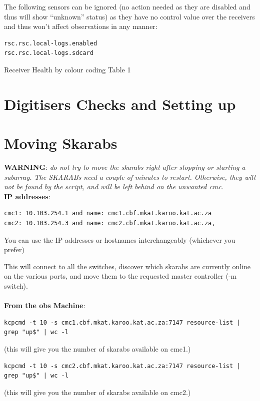 The following sensors can be ignored (no action needed as they are disabled and thus will show “unknown” status) as they have no control value over the receivers and thus won’t affect observations in any manner:
\begin{lstlisting}[style=DOS]
rsc.rsc.local-logs.enabled
rsc.rsc.local-logs.sdcard
\end{lstlisting}


Receiver Health by colour coding
Table 1

\section{Digitisers Checks and Setting up }




\section{Moving Skarabs}


\textbf{WARNING}:\textit{ do not try to move the skarabs right after stopping or starting a subarray. The SKARABs need a couple of minutes to restart. Otherwise, they will not be found by the script, and will be left behind on the unwanted cmc.}\\

\textbf{IP addresses}:\\
\begin{lstlisting}[style=DOS]
cmc1: 10.103.254.1 and name: cmc1.cbf.mkat.karoo.kat.ac.za 
cmc2: 10.103.254.3 and name: cmc2.cbf.mkat.karoo.kat.ac.za, 
\end{lstlisting}
You can use the IP addresses or hostnames interchangeably (whichever you prefer) 

This will connect to all the switches, discover which skarabs are currently online on the various ports, and move them to the requested master controller (-m switch).\\
\\
\textbf{From the obs Machine}:

\begin{lstlisting}[style=DOS]
kcpcmd -t 10 -s cmc1.cbf.mkat.karoo.kat.ac.za:7147 resource-list | grep "up$" | wc -l
\end{lstlisting}
(this will give you the number of skarabs available on cmc1.) 
\begin{lstlisting}[style=DOS]
kcpcmd -t 10 -s cmc2.cbf.mkat.karoo.kat.ac.za:7147 resource-list | grep "up$" | wc -l
\end{lstlisting}
(this will give you the number of skarabs available on cmc2.) \\

